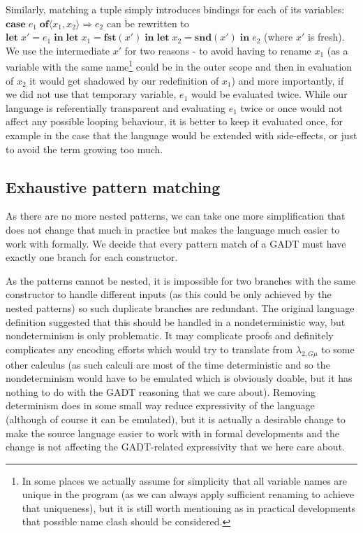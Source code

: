 Similarly, matching a tuple simply introduces bindings for each of its variables: $\mathbf{case} \; e_1 \; \mathbf{of} \langle x_1, x_2 \rangle \Rightarrow e_2$ can be rewritten to $\mathbf{let}\; x' = e_1 \; \mathbf{in} \; \mathbf{let}\; x_1 = \mathbf{fst}(x') \; \mathbf{in} \; \mathbf{let}\; x_2 = \mathbf{snd}(x') \; \mathbf{in} \; e_2$ (where $x'$ is fresh). We use the intermediate $x'$ for two reasons - to avoid having to rename $x_1$ (as a variable with the same name\footnote{In some places we actually assume for simplicity that all variable names are unique in the program (as we can always apply sufficient renaming to achieve that uniqueness), but it is still worth mentioning as in practical developments that possible name clash should be considered.} could be in the outer scope and then in evaluation of $x_2$ it would get shadowed by our redefinition of $x_1$) and more importantly, if we did not use that temporary variable, $e_1$ would be evaluated twice. While our language is referentially transparent and evaluating $e_1$ twice or once would not affect any possible looping behaviour, it is better to keep it evaluated once, for example in the case that the language would be extended with side-effects, or just to avoid the term growing too much.

\subsection{Exhaustive pattern matching}

As there are no more nested patterns, we can take one more simplification that does not change that much in practice but makes the language much easier to work with formally. We decide that every pattern match of a GADT must have exactly one branch for each constructor.

As the patterns cannot be nested, it is impossible for two branches with the same constructor to handle different inputs (as this could be only achieved by the nested patterns) so such duplicate branches are redundant. The original language definition suggested that this should be handled in a nondeterministic way, but nondeterminism is only problematic. It may complicate proofs and definitely complicates any encoding efforts which would try to translate from $\lambda_{2,G\mu}$ to some other calculus (as such calculi are most of the time deterministic and so the nondeterminism would have to be emulated which is obviously doable, but it has nothing to do with the GADT reasoning that we care about). Removing determinism does in some small way reduce expressivity of the language (although of course it can be emulated), but it is actually a desirable change to make the source language easier to work with in formal developments and the change is not affecting the GADT-related expressivity that we here care about.

